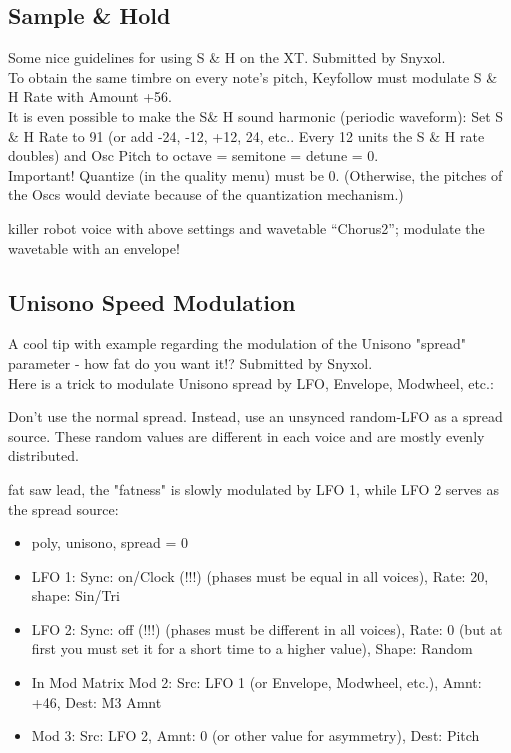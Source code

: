 \subsection{Sample \& Hold}
Some nice guidelines for using S \& H on the XT. Submitted by Snyxol.\\
To obtain the same timbre on every note's pitch, Keyfollow must modulate S \& H Rate with Amount +56.\\
It is even possible to make the S\& H sound harmonic (periodic waveform): Set S \& H Rate to 91 (or add -24, -12, +12, 24, etc.. Every 12 units the S \& H rate doubles) and Osc Pitch to octave = semitone = detune = 0.\\
Important! Quantize (in the quality menu) must be 0. (Otherwise, the pitches of the Oscs would deviate because of the quantization mechanism.)
\begin{example}
	killer robot voice with above settings and wavetable ``Chorus2''; modulate the wavetable with an envelope!
\end{example}
\subsection{Unisono Speed Modulation}
A cool tip with example regarding the modulation of the Unisono "spread" parameter - how fat do you want it!? Submitted by Snyxol.\\
Here is a trick to modulate Unisono spread by LFO, Envelope, Modwheel, etc.:

Don't use the normal spread. Instead, use an unsynced random-LFO as a spread source. These random values are different in each voice and are mostly evenly distributed.
\begin{example}
	fat saw lead, the "fatness" is slowly modulated by LFO 1, while LFO 2 serves as the spread source:
	\begin{itemize}
		\item poly, unisono, spread = 0
		\item LFO 1: Sync: on/Clock (!!!) (phases must be equal in all voices), Rate: 20, shape: Sin/Tri
		\item LFO 2: Sync: off (!!!) (phases must be different in all voices), Rate: 0 (but at first you must set it for a short time to a higher value), Shape: Random
		\item In Mod Matrix Mod 2: Src: LFO 1 (or Envelope, Modwheel, etc.), Amnt: +46, Dest: M3 Amnt
		\item Mod 3: Src: LFO 2, Amnt: 0 (or other value for asymmetry), Dest: Pitch
	\end{itemize}
\end{example}
